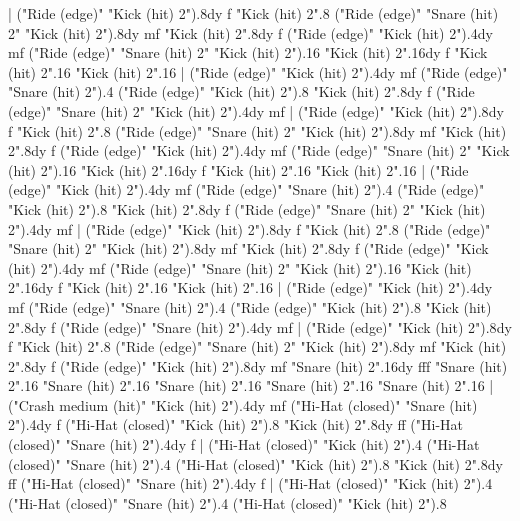    |
      ("Ride (edge)" "Kick (hit) 2").8{dy f}
      "Kick (hit) 2".8
      ("Ride (edge)" "Snare (hit) 2" "Kick (hit) 2").8{dy mf}
      "Kick (hit) 2".8{dy f}
      ("Ride (edge)" "Kick (hit) 2").4{dy mf}
      ("Ride (edge)" "Snare (hit) 2" "Kick (hit) 2").16
      "Kick (hit) 2".16{dy f}
      "Kick (hit) 2".16
      "Kick (hit) 2".16
    |
      ("Ride (edge)" "Kick (hit) 2").4{dy mf}
      ("Ride (edge)" "Snare (hit) 2").4
      ("Ride (edge)" "Kick (hit) 2").8
      "Kick (hit) 2".8{dy f}
      ("Ride (edge)" "Snare (hit) 2" "Kick (hit) 2").4{dy mf}
    |
      ("Ride (edge)" "Kick (hit) 2").8{dy f}
      "Kick (hit) 2".8
      ("Ride (edge)" "Snare (hit) 2" "Kick (hit) 2").8{dy mf}
      "Kick (hit) 2".8{dy f}
      ("Ride (edge)" "Kick (hit) 2").4{dy mf}
      ("Ride (edge)" "Snare (hit) 2" "Kick (hit) 2").16
      "Kick (hit) 2".16{dy f}
      "Kick (hit) 2".16
      "Kick (hit) 2".16
    |
      ("Ride (edge)" "Kick (hit) 2").4{dy mf}
      ("Ride (edge)" "Snare (hit) 2").4
      ("Ride (edge)" "Kick (hit) 2").8
      "Kick (hit) 2".8{dy f}
      ("Ride (edge)" "Snare (hit) 2" "Kick (hit) 2").4{dy mf}
    |
      ("Ride (edge)" "Kick (hit) 2").8{dy f}
      "Kick (hit) 2".8
      ("Ride (edge)" "Snare (hit) 2" "Kick (hit) 2").8{dy mf}
      "Kick (hit) 2".8{dy f}
      ("Ride (edge)" "Kick (hit) 2").4{dy mf}
      ("Ride (edge)" "Snare (hit) 2" "Kick (hit) 2").16
      "Kick (hit) 2".16{dy f}
      "Kick (hit) 2".16
      "Kick (hit) 2".16
    |
      ("Ride (edge)" "Kick (hit) 2").4{dy mf}
      ("Ride (edge)" "Snare (hit) 2").4
      ("Ride (edge)" "Kick (hit) 2").8
      "Kick (hit) 2".8{dy f}
      ("Ride (edge)" "Snare (hit) 2").4{dy mf}
    |
      ("Ride (edge)" "Kick (hit) 2").8{dy f}
      "Kick (hit) 2".8
      ("Ride (edge)" "Snare (hit) 2" "Kick (hit) 2").8{dy mf}
      "Kick (hit) 2".8{dy f}
      ("Ride (edge)" "Kick (hit) 2").8{dy mf}
      "Snare (hit) 2".16{dy fff}
      "Snare (hit) 2".16
      "Snare (hit) 2".16
      "Snare (hit) 2".16
      "Snare (hit) 2".16
      "Snare (hit) 2".16
    |
      ("Crash medium (hit)" "Kick (hit) 2").4{dy mf}
      ("Hi-Hat (closed)" "Snare (hit) 2").4{dy f}
      ("Hi-Hat (closed)" "Kick (hit) 2").8
      "Kick (hit) 2".8{dy ff}
      ("Hi-Hat (closed)" "Snare (hit) 2").4{dy f}
    |
      ("Hi-Hat (closed)" "Kick (hit) 2").4
      ("Hi-Hat (closed)" "Snare (hit) 2").4
      ("Hi-Hat (closed)" "Kick (hit) 2").8
      "Kick (hit) 2".8{dy ff}
      ("Hi-Hat (closed)" "Snare (hit) 2").4{dy f}
    |
      ("Hi-Hat (closed)" "Kick (hit) 2").4
      ("Hi-Hat (closed)" "Snare (hit) 2").4
      ("Hi-Hat (closed)" "Kick (hit) 2").8
